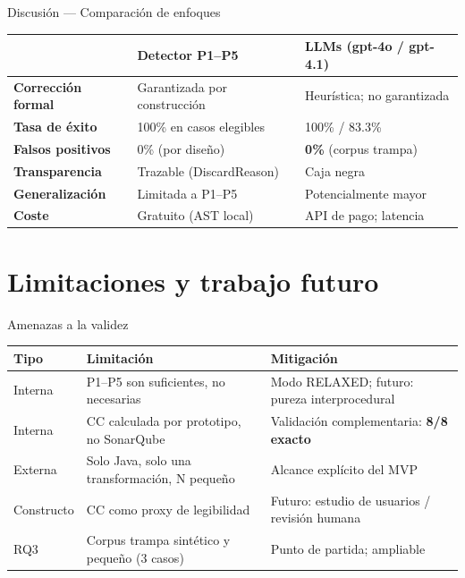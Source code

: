 \documentclass[aspectratio=169, 10pt]{beamer}
\newcommand{\ok}[1]{\textcolor{okgreen}{\textbf{#1}}}
\begin{document}
\begin{frame}{Discusión --- Comparación de enfoques}
  \begin{table}
    \centering
    \footnotesize
    \begin{tabular}{p{3.2cm}p{4.2cm}p{4.2cm}}
      \toprule
      & \textbf{Detector P1--P5} & \textbf{LLMs (gpt-4o / gpt-4.1)} \\
      \midrule
      \textbf{Corrección formal}
        & Garantizada por construcción
        & Heurística; no garantizada \\
      \textbf{Tasa de éxito}
        & 100\% en casos elegibles
        & 100\% / 83.3\% \\
      \textbf{Falsos positivos}
        & 0\% (por diseño)
        & \ok{0\%} (corpus trampa) \\
      \textbf{Transparencia}
        & Trazable (DiscardReason)
        & Caja negra \\
      \textbf{Generalización}
        & Limitada a P1--P5
        & Potencialmente mayor \\
      \textbf{Coste}
        & Gratuito (AST local)
        & API de pago; latencia \\
      \bottomrule
    \end{tabular}
  \end{table}
\end{frame}

\section{Limitaciones y trabajo futuro}

\begin{frame}{Amenazas a la validez}
  \begin{table}
    \centering
    \footnotesize
    \begin{tabular}{p{2.2cm}p{4.5cm}p{4.5cm}}
      \toprule
      \textbf{Tipo} & \textbf{Limitación} & \textbf{Mitigación} \\
      \midrule
      Interna
        & P1--P5 son suficientes, no necesarias
        & Modo RELAXED; futuro: pureza interprocedural \\
      Interna
        & CC calculada por prototipo, no SonarQube
        & Validación complementaria: \ok{8/8 exacto} \\
      Externa
        & Solo Java, solo una transformación, N pequeño
        & Alcance explícito del MVP \\
      Constructo
        & CC como proxy de legibilidad
        & Futuro: estudio de usuarios / revisión humana \\
      RQ3
        & Corpus trampa sintético y pequeño (3 casos)
        & Punto de partida; ampliable \\
      \bottomrule
    \end{tabular}
  \end{table}
\end{frame}
\end{document}
